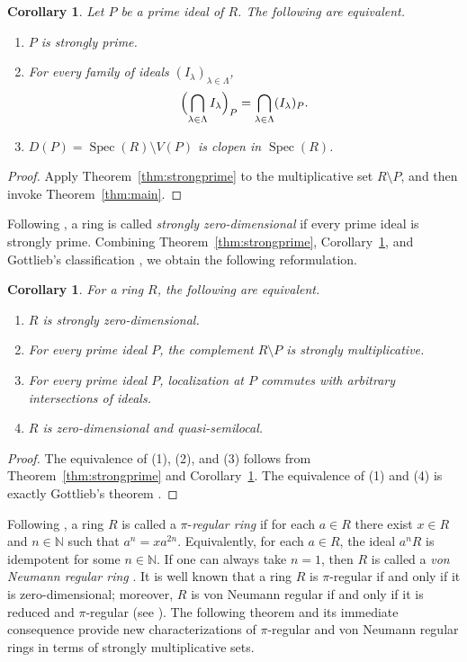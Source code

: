 \documentclass[11pt]{amsart}
\newtheorem{corollary}[theorem]{Corollary}
\theoremstyle{definition}
\theoremstyle{remark}
\newcommand{\Spec}{\operatorname{Spec}}
\begin{document}
\begin{corollary}\label{cor:prime-localization}
Let $P$ be a prime ideal of $R$.
The following are equivalent.
\begin{enumerate}
\item $P$ is strongly prime.
\item For every family of ideals $(I_\lambda)_{\lambda \in \Lambda}$,
\[
\Bigl(\bigcap_{\lambda \in \Lambda} I_\lambda\Bigr)_P
=
\bigcap_{\lambda \in \Lambda} (I_\lambda)_P.
\]
\item $D(P)=\Spec(R)\setminus V(P)$ is clopen in $\Spec(R)$.
\end{enumerate}
\end{corollary}

\begin{proof}
Apply Theorem~\ref{thm:strongprime} to the multiplicative set $R \setminus P$, and then invoke Theorem~\ref{thm:main}.
\end{proof}

Following \cite{Tekir}, a ring is called \emph{strongly zero-dimensional} if every prime ideal is strongly prime.
Combining Theorem~\ref{thm:strongprime}, Corollary~\ref{cor:prime-localization}, and Gottlieb's classification \cite[Theorem~2.4]{Gotlieb}, we obtain the following reformulation.

\begin{corollary}\label{cor:szd}
For a ring $R$, the following are equivalent.
\begin{enumerate}
\item $R$ is strongly zero-dimensional.
\item For every prime ideal $P$, the complement $R \setminus P$ is strongly multiplicative.
\item For every prime ideal $P$, localization at $P$ commutes with arbitrary intersections of ideals.
\item $R$ is zero-dimensional and quasi-semilocal.
\end{enumerate}
\end{corollary}

\begin{proof}
The equivalence of (1), (2), and (3) follows from Theorem~\ref{thm:strongprime} and Corollary~\ref{cor:prime-localization}.
The equivalence of (1) and (4) is exactly Gottlieb's theorem \cite[Theorem~2.4]{Gotlieb}.
\end{proof}

Following \cite{McCoy}, a ring $R$ is called a $\pi$-\emph{regular ring} if for each $a\in R$ there exist $x\in R$ and $n\in\mathbb{N}$ such that $a^n=xa^{2n}$. Equivalently, for each $a\in R$, the ideal $a^nR$ is idempotent for some $n\in\mathbb{N}$. If one can always take $n=1$, then $R$ is called a \emph{von Neumann regular ring} \cite{VonNeumann}. It is well known that a ring $R$ is $\pi$-regular if and only if it is zero-dimensional; moreover, $R$ is von Neumann regular if and only if it is reduced and $\pi$-regular (see \cite[Theorem 2.24 and Theorem 3.6]{Koc2020}). The following theorem and its immediate consequence provide new characterizations of $\pi$-regular and von Neumann regular rings in terms of strongly multiplicative sets.
\end{document}
